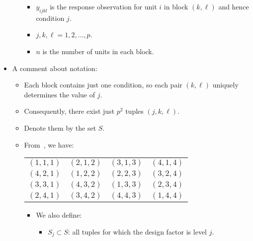 \begin{itemize}
\begin{itemize}
                        \begin{itemize}
                              \item $ y_{ijkl} $ is the response observation for unit $ i $ in block $ (k,\ell) $ and hence condition $ j $.
                              \item $ j,k,\ell=1,2,\ldots,p $.
                              \item $ n $ is the number of units in each block.
                        \end{itemize}
            \end{itemize}
      \item A comment about notation:
            \begin{itemize}
                  \item Each block contains just one condition, so each pair $(k, \ell)$ uniquely determines the value of $j$.
                  \item Consequently, there exist just $p^2$ tuples $(j, k, \ell)$.
                  \item Denote them by the set $ S $.
                  \item From~, we have:
                        \begin{table}[!htbp]
                              \centering
                              \begin{NiceTabular}{|cccc|}
                                    \toprule
                                    $ (1,1,1) $ & $ (2,1,2) $ & $ (3,1,3) $ & $ (4,1,4) $\\
                                    $ (4,2,1) $ & $ (1,2,2) $ & $ (2,2,3) $ & $ (3,2,4) $\\
                                    $ (3,3,1) $ & $ (4,3,2) $ & $ (1,3,3) $ & $ (2,3,4) $\\
                                    $ (2,4,1) $ & $ (3,4,2) $ & $ (4,4,3) $ & $ (1,4,4) $\\
                                    \bottomrule
                              \end{NiceTabular}
                        \end{table}
                        \begin{itemize}
                              \item We also define:
                                    \begin{itemize}
                                          \item $ S_j\subset S $: all tuples for which the design factor is level $ j $.

\end{itemize}
\end{itemize}
\end{itemize}
\end{itemize}
